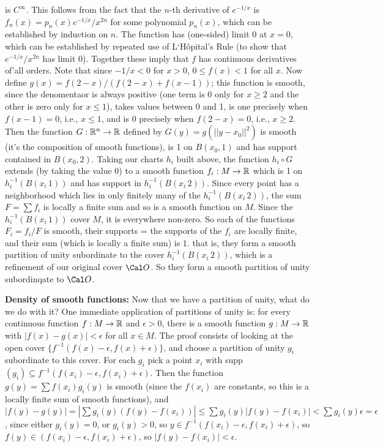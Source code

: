 \noindent is $C^\infty$. This follows from the fact that the $n$-th derivative of
$e^{-1/x}$ is $f_n(x)=p_n(x)e^{-1/x}/x^{2n}$ for some polynomial $p_n(x)$, which can be established
by induction on $n$. The function has (one-sided) limit $0$ at $x=0$, which can be established by
repeated use of L`H\^opital's Rule (to show that $e^{-1/x}/x^{2n}$ has limit 0). 
Together these imply that $f$ has continuous derivatives of'all orders. Note that since
$-1/x<0$ for $x>0$, $0\leq f(x) <1$ for all $x$. Now define 
$g(x)=f(2-x)/(f(2-x)+f(x-1))$; this function is smooth, since the denomentaor is always positive
(one term is 0 only for $x\geq 2$ and the other is zero only for $x\leq 1$), takes values
between 0 and 1, is one precisely when $f(x-1)=0$, i.e., $x\leq 1$, and is 0 precisely when 
$f(2-x)=0$, i.e., $x\geq 2$. Then the function $G:{\Bbb R}^n\rightarrow {\Bbb R}$ defined by
$G(y)=g(||y-x_0||^2)$ is smooth (it's the composition of smooth functions), is
1 on $B(x_0,1)$ and has support contained in $B(x_0,2)$. Taking our charts $h_i$
built above, the function $h_i\circ G$ extends (by taking the value 0) to a smooth 
function $f_i:M\rightarrow {\Bbb R}$ which is 1 on 
$h_i^{-1}(B(x_i\,1))$ and has support in $h_i^{-1}(B(x_i\,2))$. Since every
point has a neighborhood which lies in only finitely many of the $h_i^{-1}(B(x_i\,2))$,
the sum $F=\sum f_i$ is locally a finite sum and so is a smooth function on $M$.
Since the $h_i^{-1}(B(x_i\,1))$ cover $M$, it is everywhere non-zero. So each 
of the functions $F_i=f_i/F$ is smooth, their supports = the supports of the $f_i$
are locally finite, and their sum (which is locally a finite sum) is $1$. that is,
they form a smooth partition of unity subordinate to the cover
$h_i^{-1}(B(x_i\,2))$, which is a refinement of our original cover $\Cal O$. So they
form a smooth partition of unity subordinqate to $\Cal O$.

\msk

{\bf Density of smooth functions:} Now that we have a partition of unity, what do we do with it?
One immediate application of partitions of unity is: for every continuous function $f:M\rightarrow {\Bbb R}$
and $\epsilon > 0$, there is a smooth function $g:M\rightarrow {\Bbb R}$ with $|f(x)-g(x)|< \epsilon$ 
for all $x\in M$. The proof consists of looking at the open cover $\{f^{-1}(f(x)-\epsilon,f(x)+\epsilon)\}$,
and choose a partition of unity $g_i$ subordinate to this cover. For each $g_i$ pick a point $x_i$ with 
supp$(g_i)\subseteq f^{-1}(f(x_i)-\epsilon,f(x_i)+\epsilon)$. Then the function $g(y)=\sum f(x_i)g_i(y)$ is smooth
(since the $f(x_i)$ are constants, so this is a locally finite sum of smooth functions), and 
$|f(y)-g(y)|=|\sum g_i(y)(f(y)-f(x_i))|\leq \sum g_i(y)|f(y)-f(x_i)| < \sum g_i(y) \epsilon = \epsilon$,
since either $g_i(y)=0$, or $g_i(y)>0$, so $y\in f^{-1}(f(x_i)-\epsilon,f(x_i)+\epsilon)$, so 
$f(y)\in (f(x_i)-\epsilon,f(x_i)+\epsilon)$, so $|f(y)-f(x_i)|<\epsilon$.

